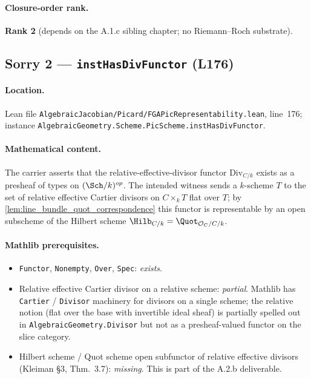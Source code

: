 \paragraph{Closure-order rank.} \textbf{Rank 2} (depends on the A.1.c
sibling chapter; no Riemann--Roch substrate).

\subsection{Sorry 2 --- \texttt{instHasDivFunctor} (L176)}
\label{subsec:sorry_has_div_functor}

\paragraph{Location.} Lean file
\texttt{AlgebraicJacobian/Picard/FGAPicRepresentability.lean},
line~176; instance
\texttt{AlgebraicGeometry.Scheme.PicScheme.instHasDivFunctor}.

\paragraph{Mathematical content.} The carrier asserts that the
relative-effective-divisor functor $\mathrm{Div}_{C/k}$ exists as a
presheaf of types on $(\Sch/k)^{op}$. The intended witness sends a
$k$-scheme $T$ to the set of relative effective Cartier divisors on
$C \times_k T$ flat over $T$; by \cref{lem:line_bundle_quot_correspondence}
this functor is representable by an open subscheme of the Hilbert
scheme $\Hilb_{C/k} = \Quot_{\mathcal{O}_C / C / k}$.

\paragraph{Mathlib prerequisites.}
\begin{itemize}
  \item \texttt{Functor}, \texttt{Nonempty}, \texttt{Over},
    \texttt{Spec}: \emph{exists}.
  \item Relative effective Cartier divisor on a relative scheme:
    \emph{partial}. Mathlib has \texttt{Cartier} / \texttt{Divisor}
    machinery for divisors on a single scheme; the relative notion
    (flat over the base with invertible ideal sheaf) is partially
    spelled out in \texttt{AlgebraicGeometry.Divisor} but not as a
    presheaf-valued functor on the slice category.
  \item Hilbert scheme / Quot scheme open subfunctor of relative
    effective divisors (Kleiman \S3, Thm.~3.7):
    \emph{missing}. This is part of the A.2.b deliverable.
\end{itemize}

